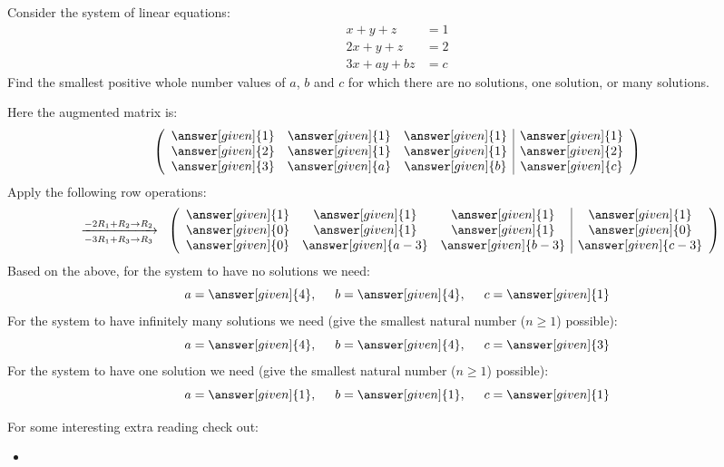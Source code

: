 \documentclass{ximera}
\begin{document}
\begin{example}
  Consider the system of linear equations:
  \begin{align*}
    x+y+z &=  1\\
    2x+y+z &=  2\\
    3x+ay+bz &= c
  \end{align*}
  Find the smallest positive whole number values of $a$, $b$ and $c$
  for which there are no solutions, one solution, or many solutions.
  \begin{explanation}
    Here the augmented matrix is:
    \[\left(\begin{array}{ccc|c}
    \answer[given]{1} &  \answer[given]{1} &  \answer[given]{1} &  \answer[given]{1} \\
    \answer[given]{2} &  \answer[given]{1} &  \answer[given]{1} &  \answer[given]{2} \\
    \answer[given]{3} &  \answer[given]{a} &  \answer[given]{b} &  \answer[given]{c}
    \end{array}\right)\]
    Apply the following row operations:
    \[
    \hspace{.2cm} \xrightarrow[-3R_{1}+R_{3}\rightarrow R_{3}]
           {-2R_{1} + R_{2}\rightarrow R_{2}}\hspace{.2cm}
    \left(\begin{array}{ccc|c}
      \answer[given]{1} &  \answer[given]{1} &  \answer[given]{1} &  \answer[given]{1} \\
      \answer[given]{0} &  \answer[given]{1} &  \answer[given]{1} &  \answer[given]{0} \\
      \answer[given]{0} &  \answer[given]{a-3} &  \answer[given]{b-3} &  \answer[given]{c-3}
    \end{array}\right)\]
    Based on the above, for the system to have no solutions we need:
    \[
    a = \answer[given]{4}, \hspace{.5cm} b = \answer[given]{4}, \hspace{.5cm} c = \answer[given]{1}
    \]
    For the system to have infinitely many solutions we need (give the smallest natural number ($n\geq 1$) possible):
    \[
    a = \answer[given]{4}, \hspace{.5cm} b = \answer[given]{4}, \hspace{.5cm} c = \answer[given]{3}
    \]
    For the system to have one solution we need (give the smallest natural number ($n\geq 1$) possible):
    \[
    a = \answer[given]{1}, \hspace{.5cm} b = \answer[given]{1}, \hspace{.5cm} c = \answer[given]{1}
    \]
  \end{explanation}
\end{example}


For some interesting extra reading check out:
\begin{itemize}
\item {}
\end{itemize}
\end{document}
